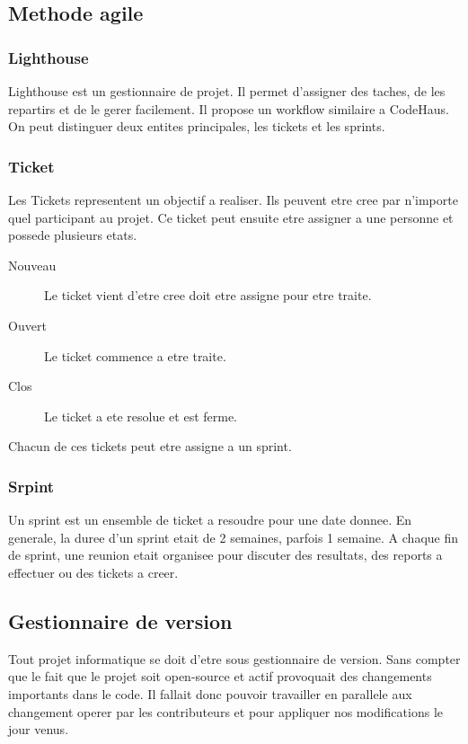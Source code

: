 \subsection{Methode agile}
\subsubsection{Lighthouse}
Lighthouse est un gestionnaire de projet. Il permet d'assigner des taches, de les repartirs et de le gerer facilement. Il propose un workflow similaire a CodeHaus. On peut distinguer deux entites principales, les tickets et les sprints.
\subsubsection{Ticket}
Les Tickets representent un objectif a realiser. Ils peuvent etre cree par n'importe quel participant au projet. Ce ticket peut ensuite etre assigner a une personne et possede plusieurs etats.

\begin{description}
 \item[Nouveau] Le ticket vient d'etre cree doit etre assigne pour etre traite.
\item[Ouvert] Le ticket commence a etre traite.
\item[Clos] Le ticket a ete resolue et est ferme.
 \end{description}
Chacun de ces tickets peut etre assigne a un sprint.
\subsubsection{Srpint}
Un sprint est un ensemble de ticket a resoudre pour une date donnee. En generale, la duree d'un sprint etait de 2 semaines, parfois 1 semaine. A chaque fin de sprint, une reunion etait organisee pour discuter des resultats, des reports a effectuer ou des tickets a creer.
\subsection{Gestionnaire de version}
Tout projet informatique se doit d'etre sous gestionnaire de version. Sans compter que le fait que le projet soit open-source et actif provoquait des changements importants dans le code. Il fallait donc pouvoir travailler en parallele aux changement operer par les contributeurs et pour appliquer nos modifications le jour venus.

